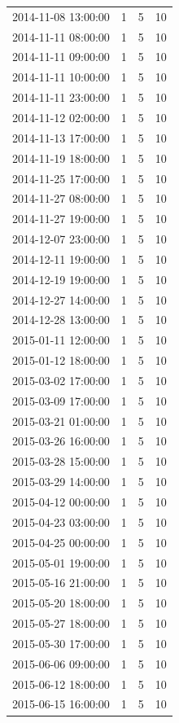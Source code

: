 \begin{tabular}{lrrr}
2014-11-08 13:00:00 & 1 & 5 & 10 \\
2014-11-11 08:00:00 & 1 & 5 & 10 \\
2014-11-11 09:00:00 & 1 & 5 & 10 \\
2014-11-11 10:00:00 & 1 & 5 & 10 \\
2014-11-11 23:00:00 & 1 & 5 & 10 \\
2014-11-12 02:00:00 & 1 & 5 & 10 \\
2014-11-13 17:00:00 & 1 & 5 & 10 \\
2014-11-19 18:00:00 & 1 & 5 & 10 \\
2014-11-25 17:00:00 & 1 & 5 & 10 \\
2014-11-27 08:00:00 & 1 & 5 & 10 \\
2014-11-27 19:00:00 & 1 & 5 & 10 \\
2014-12-07 23:00:00 & 1 & 5 & 10 \\
2014-12-11 19:00:00 & 1 & 5 & 10 \\
2014-12-19 19:00:00 & 1 & 5 & 10 \\
2014-12-27 14:00:00 & 1 & 5 & 10 \\
2014-12-28 13:00:00 & 1 & 5 & 10 \\
2015-01-11 12:00:00 & 1 & 5 & 10 \\
2015-01-12 18:00:00 & 1 & 5 & 10 \\
2015-03-02 17:00:00 & 1 & 5 & 10 \\
2015-03-09 17:00:00 & 1 & 5 & 10 \\
2015-03-21 01:00:00 & 1 & 5 & 10 \\
2015-03-26 16:00:00 & 1 & 5 & 10 \\
2015-03-28 15:00:00 & 1 & 5 & 10 \\
2015-03-29 14:00:00 & 1 & 5 & 10 \\
2015-04-12 00:00:00 & 1 & 5 & 10 \\
2015-04-23 03:00:00 & 1 & 5 & 10 \\
2015-04-25 00:00:00 & 1 & 5 & 10 \\
2015-05-01 19:00:00 & 1 & 5 & 10 \\
2015-05-16 21:00:00 & 1 & 5 & 10 \\
2015-05-20 18:00:00 & 1 & 5 & 10 \\
2015-05-27 18:00:00 & 1 & 5 & 10 \\
2015-05-30 17:00:00 & 1 & 5 & 10 \\
2015-06-06 09:00:00 & 1 & 5 & 10 \\
2015-06-12 18:00:00 & 1 & 5 & 10 \\
2015-06-15 16:00:00 & 1 & 5 & 10 \\

\end{tabular}
